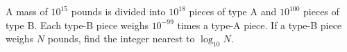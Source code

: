 A mass of $10^{15}$ pounds is divided into $10^{18}$ pieces of type A and $10^{100}$ pieces of type B. Each type-B piece weighs $10^{-99}$ times a type-A piece. If a type-B piece weighs $N$ pounds, find the integer nearest to $\log_{10}N$.
